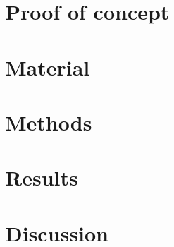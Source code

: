 \section{Proof of concept}



\section{Material}
\section{Methods}
\section{Results}
\section{Discussion}

